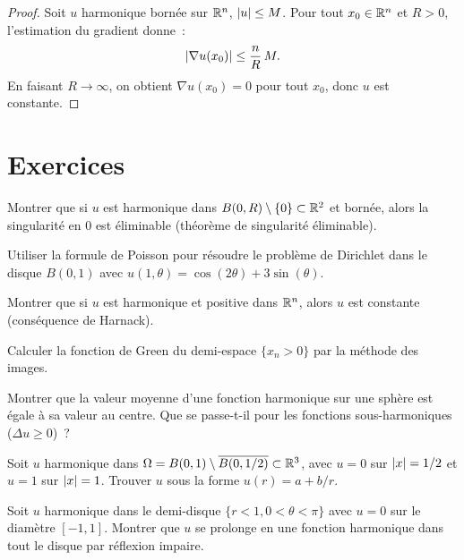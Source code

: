 \begin{proof}
Soit $u$ harmonique born\'ee sur $\mathbb{R}^n$, $\left| u \right| \leq M$. Pour tout
$x_0 \in \mathbb{R}^n$ et $R > 0$, l'estimation du gradient donne~:
\[
    \left| \nabla u(x_0) \right| \leq \frac{n}{R}\, M.
\]
En faisant $R \to \infty$, on obtient $\nabla u(x_0) = 0$ pour tout $x_0$,
donc $u$ est constante.
\end{proof}

\section{Exercices}

\begin{exercice}
Montrer que si $u$ est harmonique dans $B(0,R) \setminus \{0\} \subset \mathbb{R}^2$
et born\'ee, alors la singularit\'e en $0$ est \'eliminable (th\'eor\`eme
de singularit\'e \'eliminable).
\end{exercice}

\begin{exercice}
Utiliser la formule de Poisson pour r\'esoudre le probl\`eme de Dirichlet
dans le disque $B(0,1)$ avec $u(1,\theta) = \cos(2\theta) + 3\sin(\theta)$.
\end{exercice}

\begin{exercice}
Montrer que si $u$ est harmonique et positive dans $\mathbb{R}^n$, alors $u$
est constante (cons\'equence de Harnack).
\end{exercice}

\begin{exercice}
Calculer la fonction de Green du demi-espace $\{x_n > 0\}$ par la
m\'ethode des images.
\end{exercice}

\begin{exercice}
Montrer que la valeur moyenne d'une fonction harmonique sur une sph\`ere
est \'egale \`a sa valeur au centre. Que se passe-t-il pour les fonctions
sous-harmoniques ($\Delta u \geq 0$)~?
\end{exercice}

\begin{exercice}
Soit $u$ harmonique dans $\Omega = B(0,1) \setminus \overline{B(0,1/2)}
\subset \mathbb{R}^3$, avec $u = 0$ sur $\left| x \right| = 1/2$ et $u = 1$ sur $\left| x \right| = 1$.
Trouver $u$ sous la forme $u(r) = a + b/r$.
\end{exercice}

\begin{exercice}
Soit $u$ harmonique dans le demi-disque $\{r < 1, 0 < \theta < \pi\}$
avec $u = 0$ sur le diam\`etre $[-1,1]$. Montrer que $u$ se prolonge en
une fonction harmonique dans tout le disque par r\'eflexion impaire.
\end{exercice}
